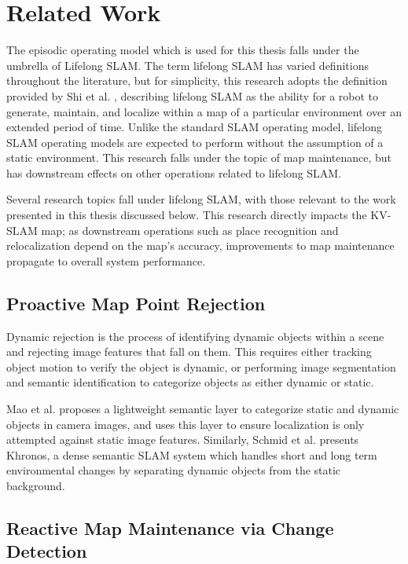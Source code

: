 \section{Related Work}
\label{sec:related_work}

The episodic operating model which is used for this thesis falls under the umbrella of Lifelong SLAM. The term lifelong SLAM has varied definitions throughout the literature, but for simplicity, this research adopts the definition provided by Shi et al. \cite{shiAreWeReady2020}, describing lifelong SLAM as the ability for a robot to generate, maintain, and localize within a map of a particular environment over an extended period of time. Unlike the standard SLAM operating model, lifelong SLAM operating models are expected to perform without the assumption of a static environment. This research falls under the topic of map maintenance, but has downstream effects on other operations related to lifelong SLAM.

Several research topics fall under lifelong SLAM, with those relevant to the work presented in this thesis discussed below. This research directly impacts the KV-SLAM map; as downstream operations such as place recognition and relocalization depend on the map's accuracy, improvements to map maintenance propagate to overall system performance.

\subsection{Proactive Map Point Rejection}

Dynamic rejection is the process of identifying dynamic objects within a scene and rejecting image features that fall on them. This requires either tracking object motion to verify the object is dynamic, or performing image segmentation and semantic identification to categorize objects as either dynamic or static.

Mao et al. \cite{maoSemanticMaskingVisual2024} proposes a lightweight semantic layer to categorize static and dynamic objects in camera images, and uses this layer to ensure localization is only attempted against static image features. Similarly, Schmid et al. \cite{schmidKhronosUnifiedApproach2024} presents Khronos, a dense semantic SLAM system which handles short and long term environmental changes by separating dynamic objects from the static background.

\subsection{Reactive Map Maintenance via Change Detection}


